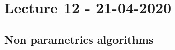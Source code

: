 \documentclass[../main.tex]{subfiles}
\begin{document}
\chapter{Lecture 12 - 21-04-2020}

\section{Non parametrics algorithms}

\end{document}
